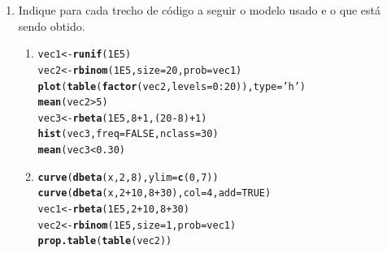 \documentclass[11pt,a4]{article}\usepackage[]{graphicx}\usepackage[]{xcolor}
\makeatletter
\newcommand{\hlnum}[1]{\textcolor[rgb]{0.686,0.059,0.569}{#1}}%
\newcommand{\hlsng}[1]{\textcolor[rgb]{0.192,0.494,0.8}{#1}}%
\newcommand{\hlopt}[1]{\textcolor[rgb]{0,0,0}{#1}}%
\newcommand{\hldef}[1]{\textcolor[rgb]{0.345,0.345,0.345}{#1}}%
\newcommand{\hlkwb}[1]{\textcolor[rgb]{0.69,0.353,0.396}{#1}}%
\newcommand{\hlkwc}[1]{\textcolor[rgb]{0.333,0.667,0.333}{#1}}%
\newcommand{\hlkwd}[1]{\textcolor[rgb]{0.737,0.353,0.396}{\textbf{#1}}}%
\newenvironment{kframe}{%
 \def\at@end@of@kframe{}%
 \ifinner\ifhmode%
  \def\at@end@of@kframe{\end{minipage}}%
  \begin{minipage}{\columnwidth}%
 \fi\fi%
 \def\FrameCommand##1{\hskip\@totalleftmargin \hskip-\fboxsep
 \colorbox{shadecolor}{##1}\hskip-\fboxsep
     \hskip-\linewidth \hskip-\@totalleftmargin \hskip\columnwidth}%
 \MakeFramed {\advance\hsize-\width
   \@totalleftmargin\z@ \linewidth\hsize
   \@setminipage}}%
 {\par\unskip\endMakeFramed%
 \at@end@of@kframe}
\newenvironment{knitrout}{}{} %
\makeatother
\begin{document}
\begin{enumerate}
\newpage

\item Indique para cada trecho de código a seguir o modelo usado e o que está sendo obtido.
  
\begin{enumerate}

\item
\begin{knitrout}
\color{fgcolor}\begin{kframe}
\begin{alltt}
\hldef{vec1} \hlkwb{<-} \hlkwd{runif}\hldef{(}\hlnum{1E5}\hldef{)}
\hldef{vec2} \hlkwb{<-} \hlkwd{rbinom}\hldef{(}\hlnum{1E5}\hldef{,} \hlkwc{size} \hldef{=} \hlnum{20}\hldef{,} \hlkwc{prob} \hldef{= vec1)}
\hlkwd{plot}\hldef{(}\hlkwd{table}\hldef{(}\hlkwd{factor}\hldef{(vec2,} \hlkwc{levels} \hldef{=} \hlnum{0}\hlopt{:}\hlnum{20}\hldef{)),} \hlkwc{type} \hldef{=} \hlsng{'h'}\hldef{)}
\hlkwd{mean}\hldef{(vec2} \hlopt{>} \hlnum{5}\hldef{)}
\hldef{vec3} \hlkwb{<-} \hlkwd{rbeta}\hldef{(}\hlnum{1E5}\hldef{,} \hlnum{8}\hlopt{+}\hlnum{1}\hldef{, (}\hlnum{20}\hlopt{-}\hlnum{8}\hldef{)}\hlopt{+}\hlnum{1}\hldef{)}
\hlkwd{hist}\hldef{(vec3,} \hlkwc{freq} \hldef{=} \hlnum{FALSE}\hldef{,} \hlkwc{nclass} \hldef{=} \hlnum{30}\hldef{)}
\hlkwd{mean}\hldef{(vec3} \hlopt{<} \hlnum{0.30}\hldef{)}
\end{alltt}
\end{kframe}
\end{knitrout}

\item
\begin{knitrout}
\color{fgcolor}\begin{kframe}
\begin{alltt}
\hlkwd{curve}\hldef{(}\hlkwd{dbeta}\hldef{(x,} \hlnum{2}\hldef{,} \hlnum{8}\hldef{),} \hlkwc{ylim} \hldef{=} \hlkwd{c}\hldef{(}\hlnum{0}\hldef{,} \hlnum{7}\hldef{))}
\hlkwd{curve}\hldef{(}\hlkwd{dbeta}\hldef{(x,} \hlnum{2} \hlopt{+} \hlnum{10}\hldef{,} \hlnum{8} \hlopt{+} \hlnum{30}\hldef{),} \hlkwc{col} \hldef{=} \hlnum{4}\hldef{,} \hlkwc{add} \hldef{=} \hlnum{TRUE}\hldef{)}
\hldef{vec1} \hlkwb{<-} \hlkwd{rbeta}\hldef{(}\hlnum{1E5}\hldef{,} \hlnum{2} \hlopt{+} \hlnum{10}\hldef{,} \hlnum{8} \hlopt{+} \hlnum{30}\hldef{)}
\hldef{vec2} \hlkwb{<-} \hlkwd{rbinom}\hldef{(}\hlnum{1E5}\hldef{,} \hlkwc{size} \hldef{=} \hlnum{1}\hldef{,} \hlkwc{prob} \hldef{= vec1)}
\hlkwd{prop.table}\hldef{(}\hlkwd{table}\hldef{(vec2))}
\end{alltt}
\end{kframe}
\end{knitrout}


\end{enumerate}
\end{enumerate}
\end{document}
